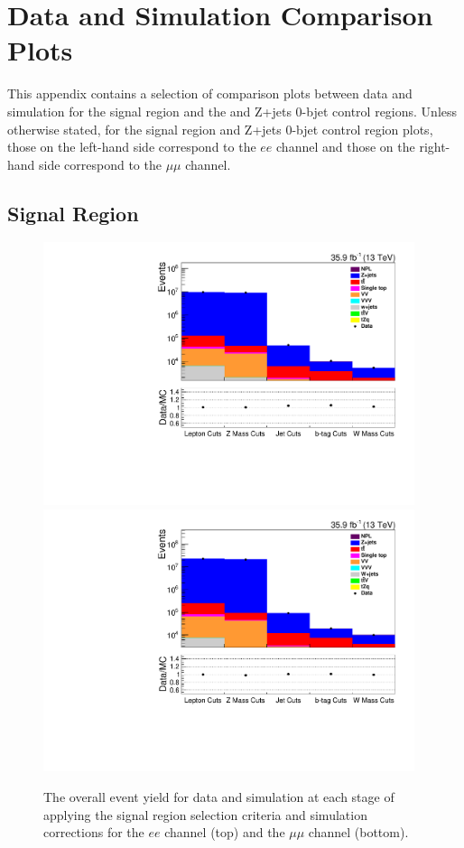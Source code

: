 \chapter{Data and Simulation Comparison Plots}\label{app:plots}
This appendix contains a selection of comparison plots between data and simulation for the signal region and the \ttbar and Z+jets 0-bjet control regions.
Unless otherwise stated, for the signal region and Z+jets 0-bjet control region plots, those on the left-hand side correspond to the $ee$ channel and those on the right-hand side correspond to the $\mu\mu$ channel.

\section{Signal Region}\label{appSec:signalRegionPlots}

\begin{figure}[h]
\centering
\includegraphics[width=0.97\textwidth]{figs/background-estimation/plots/unblinded/prompt_ee_ttbarInc/cutFlow_log.pdf}
\\
\includegraphics[width=0.97\textwidth]{figs/background-estimation/plots/unblinded/prompt_mumu_ttbarInc/cutFlow_log.pdf}
\caption{
The overall event yield for data and simulation at each stage of applying the signal region selection criteria and simulation corrections for the $ee$ channel (top) and the $\mu\mu$ channel (bottom).
}
\label{fig:SR_cutFlow}
\end{figure}

